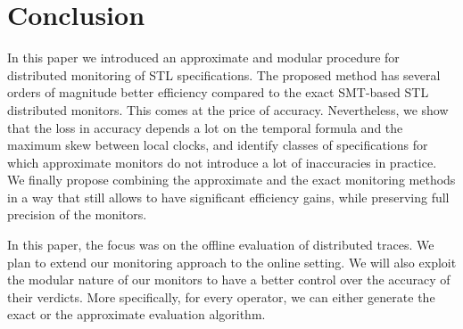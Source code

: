 \section{Conclusion} \label{sec:conclusion}

In this paper we introduced an approximate and modular procedure for distributed monitoring of STL specifications. The proposed method has several orders of magnitude better efficiency compared to the exact SMT-based STL distributed monitors. This comes at the price of accuracy. Nevertheless, we show that the loss in accuracy depends a lot on the temporal formula and the maximum skew between local clocks, and identify classes of specifications for which approximate monitors do not introduce a lot of inaccuracies in practice. We finally propose combining the approximate and the exact monitoring methods in a way that still allows to have significant efficiency gains, while preserving full precision of the monitors.  

In this paper, the focus was on the offline evaluation of distributed traces. We plan to extend our monitoring approach to the online setting. We will also exploit the modular nature of our monitors to have a better control over the accuracy of their verdicts. More specifically, for every operator, we can either generate the exact or the approximate evaluation algorithm.  